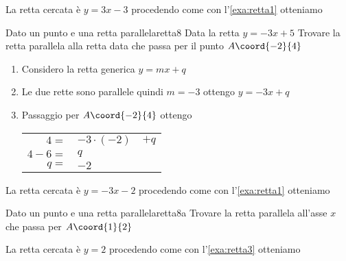 La retta cercata è $y=3x-3$ procedendo come con l'\cref{exa:retta1}
otteniamo
\begin{center}
	
	\label{fig:disegnoretta7}
\end{center}
\begin{esempiot}{Dato un punto e una retta parallela}{retta8}
	Data la retta $y=-3x+5$ Trovare la retta parallela alla retta data che  passa per il punto	$A\coord{-2}{4}$
\end{esempiot}
\begin{enumerate}
	\item Considero la retta generica $y=mx+q$
	\item Le due rette sono parallele quindi $m=-3$ ottengo $y=-3x+q$
	\item Passaggio per $A\coord{-2}{4}$ ottengo 
	\begin{tabular}{rll}
		$4=$&$-3\cdot (-2)$&$+q$\\
		$4-6=$&$q$\\
		$q=$&$-2$\\
	\end{tabular}
\end{enumerate}

La retta cercata è $y=-3x-2$ procedendo come con l'\cref{exa:retta1}
otteniamo
\begin{center}
	
	\label{fig:disegnoretta8}
\end{center}
\begin{esempiot}{Dato un punto e una retta parallela}{retta8a}
	Trovare la retta parallela all'asse $x$ che passa per $A\coord{1}{2}$
\end{esempiot}
La retta cercata è $y=2$ procedendo come con l'\cref{exa:retta3}
otteniamo
\begin{center}
	
	\label{fig:disegnoretta8a}
\end{center}
